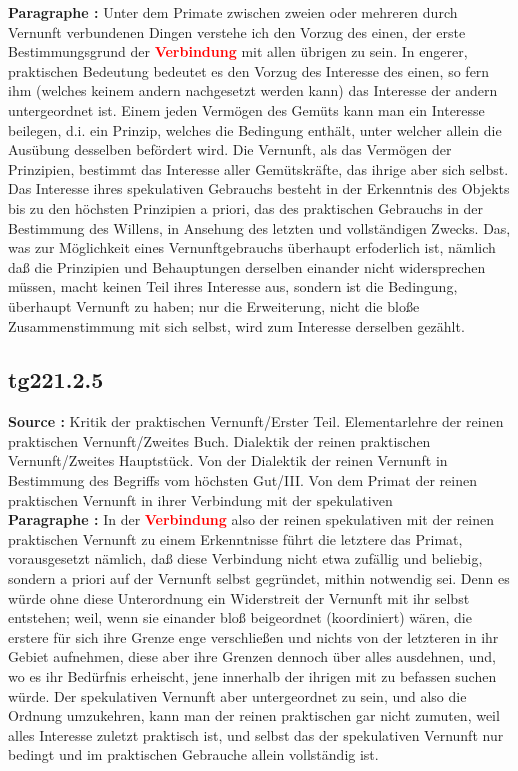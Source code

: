 \documentclass[a4paper,12pt,twoside]{book}
\newcommand{\match}[1]{\textcolor{red}{\textbf{#1}}}
\begin{document}
	\noindent\textbf{Paragraphe : }Unter dem Primate zwischen zweien oder mehreren durch Vernunft verbundenen Dingen verstehe ich den Vorzug des einen, der erste Bestimmungsgrund der \match{Verbindung} mit allen übrigen zu sein. In engerer, praktischen Bedeutung bedeutet es den Vorzug des Interesse des einen, so fern ihm (welches keinem andern nachgesetzt werden kann) das Interesse der andern untergeordnet ist. Einem jeden Vermögen des Gemüts kann man ein Interesse beilegen, d.i. ein Prinzip, welches die Bedingung enthält, unter welcher allein die Ausübung desselben befördert wird. Die Vernunft, als das Vermögen der Prinzipien, bestimmt das Interesse aller Gemütskräfte, das ihrige aber sich selbst. Das Interesse  ihres spekulativen Gebrauchs besteht in der Erkenntnis des Objekts bis zu den höchsten Prinzipien a priori, das des praktischen Gebrauchs in der Bestimmung des Willens, in Ansehung des letzten und vollständigen Zwecks. Das, was zur Möglichkeit eines Vernunftgebrauchs überhaupt erfoderlich ist, nämlich daß die Prinzipien und Behauptungen derselben einander nicht widersprechen müssen, macht keinen Teil ihres Interesse aus, sondern ist die Bedingung, überhaupt Vernunft zu haben; nur die Erweiterung, nicht die bloße Zusammenstimmung mit sich selbst, wird zum Interesse derselben gezählt. 
	
	\subsection*{tg221.2.5} 
	\textbf{Source : }Kritik der praktischen Vernunft/Erster Teil. Elementarlehre der reinen praktischen Vernunft/Zweites Buch. Dialektik der reinen praktischen Vernunft/Zweites Hauptstück. Von der Dialektik der reinen Vernunft in Bestimmung des Begriffs vom höchsten Gut/III. Von dem Primat der reinen praktischen Vernunft in ihrer Verbindung mit der spekulativen\\  
	
	\noindent\textbf{Paragraphe : }In der \match{Verbindung} also der reinen spekulativen mit der reinen praktischen Vernunft zu einem Erkenntnisse führt die letztere das Primat, vorausgesetzt nämlich, daß diese Verbindung nicht etwa zufällig und beliebig, sondern a priori auf der Vernunft selbst gegründet, mithin notwendig sei. Denn es würde ohne diese Unterordnung ein Widerstreit der Vernunft mit ihr selbst entstehen; weil, wenn sie einander bloß beigeordnet (koordiniert) wären, die erstere für sich ihre Grenze enge verschließen und nichts von der  letzteren in ihr Gebiet aufnehmen, diese aber ihre Grenzen dennoch über alles ausdehnen, und, wo es ihr Bedürfnis erheischt, jene innerhalb der ihrigen mit zu befassen suchen würde. Der spekulativen Vernunft aber untergeordnet zu sein, und also die Ordnung umzukehren, kann man der reinen praktischen gar nicht zumuten, weil alles Interesse zuletzt praktisch ist, und selbst das der spekulativen Vernunft nur bedingt und im praktischen Gebrauche allein vollständig ist. 
	
\end{document}
